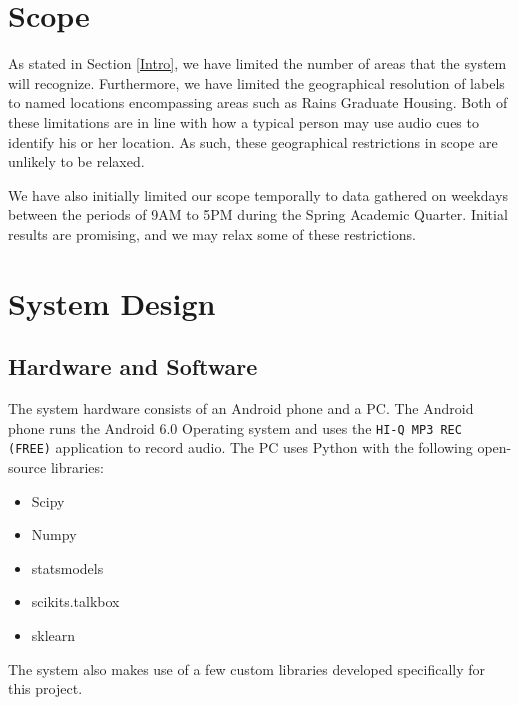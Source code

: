 \documentclass[journal]{IEEEtran}
\begin{document}
\section{Scope}
As stated in Section \ref{Intro}, we have limited the number of areas that the system will recognize. Furthermore, we have limited the geographical resolution of labels to named locations encompassing areas such as Rains Graduate Housing. Both of these limitations are in line with how a typical person may use audio cues to identify his or her location. As such, these geographical restrictions in scope are unlikely to be relaxed.

We have also initially limited our scope temporally to data gathered on weekdays between the periods of 9AM to 5PM during the Spring Academic Quarter. Initial results are promising, and we may relax some of these restrictions.

\section{System Design}\label{SystemDesign}
\subsection{Hardware and Software}\label{HwSw}
The system hardware consists of an Android phone and a PC. The Android phone runs the Android 6.0 Operating system and uses the \texttt{HI-Q MP3 REC (FREE)} application to record audio. The PC uses Python with the following open-source libraries:
\begin{itemize}
\item Scipy
\item Numpy
\item statsmodels
\item scikits.talkbox
\item sklearn
\end{itemize}
The system also makes use of a few custom libraries developed specifically for this project.
\end{document}
